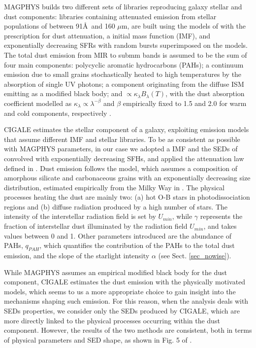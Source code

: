 \documentclass{aa}
\newcommand{\mic}{$\mu$m}
\begin{document}
MAGPHYS builds two different sets of libraries reproducing galaxy stellar and dust components: libraries containing attenuated emission from stellar populations of between 91\AA\ and 160 \mic, are built using the models of \cite{bru2} with the \cite{cha} prescription for dust attenuation, a \cite{chab} initial mass function (IMF), and exponentially decreasing SFRs with random bursts superimposed on the models. The total dust emission from MIR to submm bands is assumed to be the sum of four main components: polycyclic aromatic hydrocarbons (PAHs); a continuum emission due to small grains stochastically heated to high temperatures by the absorption of single UV photons; a component originating from the diffuse ISM emitting as a modified black body; and $\propto \kappa_\lambda B_\lambda(T)$, with the dust absorption coefficient modelled as $\kappa_\lambda \propto \lambda^{-\beta}$ and $\beta$ empirically fixed to 1.5 and 2.0 for warm and cold components, respectively \citep[see e.g.][]{dun2,mag}.

CIGALE estimates the stellar component of a galaxy, exploiting emission models that assume different IMF and stellar libraries. To be as consistent as possible with MAGPHYS parameters, in our case we adopted a \cite{chab} IMF and the SEDs of \cite{bru2} convolved with exponentially decreasing SFHs, and applied the attenuation law defined in \cite{cal}. Dust emission follows the \cite{dra} model, which assumes a composition of amorphous silicate and carbonaceous grains with an exponentially decreasing size distribution, estimated empirically from the Milky Way in \cite{wei}. The physical processes heating the dust are mainly two: (a) hot O-B stars in photodissociation regions and (b) diffuse radiation produced by a high number of stars. The intensity of the interstellar radiation field is set by $U_{min}$, while $\gamma$ represents the fraction of interstellar dust illuminated by the radiation field $U_{min}$, and takes values between 0 and 1. Other parameters introduced are the abundance of PAHs, $q_{PAH}$, which quantifies the contribution of the PAHs to the total dust emission, and the slope of the starlight intensity $\alpha$ (see Sect. \ref{sec_nowise}). 

While MAGPHYS assumes  an empirical modified black body for the dust component, CIGALE estimates the dust emission with the physically motivated \cite{dra} models, which seems to us a more appropriate choice to gain insight into the mechanisms shaping such emission. For this reason, when the analysis deals with SEDs properties, we consider only the SEDs produced by CIGALE, which are more directly linked to the physical processes occurring within the dust component. However, the results of the two methods are consistent, both in terms of physical parameters and SED shape, as shown in Fig. 5 of \cite{pap2}.
\end{document}
